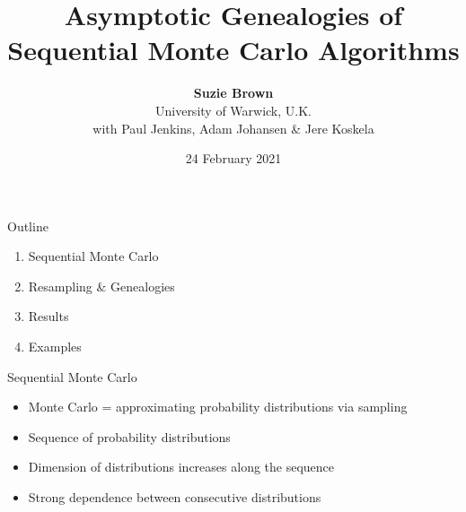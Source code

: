 \documentclass[aspectratio=169]{beamer}
\title[Genealogies of SMC Algorithms]{Asymptotic Genealogies of Sequential Monte Carlo Algorithms}
\author[Suzie Brown]{\textbf{Suzie Brown} \\[5pt] University of Warwick, U.K. \\ with Paul Jenkins, Adam Johansen \& Jere Koskela}
\date{24 February 2021}
\theoremstyle{definition}
\begin{document}
\begin{frame}
\maketitle
\end{frame}

\begin{frame}{Outline}
\begin{enumerate}
\item Sequential Monte Carlo
\item Resampling \& Genealogies
\item Results
\item Examples
\end{enumerate}
\end{frame}




\begin{frame}{Sequential Monte Carlo}
\begin{itemize}
\item Monte Carlo = approximating probability distributions via sampling %
\item Sequence of probability distributions %
\item Dimension of distributions increases along the sequence
\item Strong dependence between consecutive distributions
\end{itemize}


\end{frame}
\end{document}
